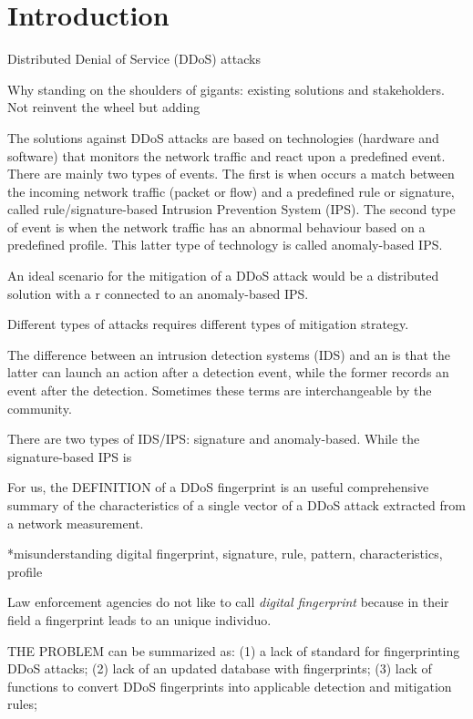 \section{Introduction}
\label{introduction}

Distributed Denial of Service (DDoS) attacks \citep{}

Why standing on the shoulders of gigants: existing solutions and stakeholders. Not reinvent the wheel but adding 

The solutions against DDoS attacks are based on technologies (hardware and software) that monitors the network traffic and react upon a predefined event. There are mainly two types of events. The first is when occurs a match between the incoming network traffic (packet or flow) and a predefined rule or signature, called rule/signature-based Intrusion Prevention System (IPS). The second type of event is when the network traffic has an abnormal behaviour based on a predefined profile. This latter type of technology is called anomaly-based IPS. 

An ideal scenario for the mitigation of a DDoS attack would be a distributed solution with a r connected to an anomaly-based IPS.

Different types of attacks requires different types of mitigation strategy.

The difference between an intrusion detection systems (IDS) and an  is that the latter can launch an action after a detection event, while the former records an event after the detection. Sometimes these terms are interchangeable by the community.

There are two types of IDS/IPS: signature and anomaly-based. While the signature-based IPS is 

For us, the DEFINITION of a DDoS fingerprint is an useful comprehensive summary of the characteristics of a single vector of a DDoS attack extracted from a network measurement.

*misunderstanding digital fingerprint, signature, rule, pattern, characteristics, profile

Law enforcement agencies do not like to call \emph{digital fingerprint} because in their field a fingerprint leads to an unique individuo.

THE PROBLEM can be summarized as: (1) a lack of standard for fingerprinting DDoS attacks; (2) lack of an updated database with fingerprints; (3) lack of functions to convert DDoS fingerprints into applicable detection and mitigation rules; 

